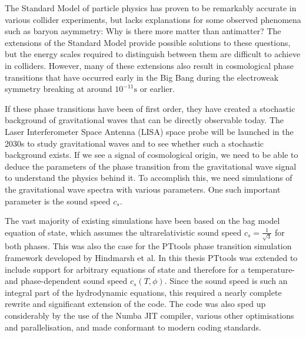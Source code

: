\iffalse
Motivation
\begin{itemize}
    \item Standard model: matches observations but lacks important explanations
    \item Baryon asymmetry
    \item GWs: a window to physics beyond the SM
    \item By phase transitions
    \item LISA project
\end{itemize}

The thesis
\begin{itemize}
    \item Highlights from the work, especially the title / thesis statement
    \item Findings
    \item Conclusion
\end{itemize}

This is among the last sections to be written.
\fi

The Standard Model of particle physics has proven to be remarkably accurate in various collider experiments,
but lacks explanations for some observed phenomena such as baryon asymmetry: Why is there more matter than antimatter?
The extensions of the Standard Model provide possible solutions to these questions,
but the energy scales required to distinguish between them are difficult to achieve in colliders.
However, many of these extensions also result in cosmological phase transitions that have occurred early in the Big Bang during the electroweak symmetry breaking at around $10^{-11} \text{s}$ or earlier.

If these phase transitions have been of first order,
they have created a stochastic background of gravitational waves that can be directly observable today.
The Laser Interferometer Space Antenna (LISA) space probe will be launched in the 2030s to study gravitational waves and
to see whether such a stochastic background exists.
If we see a signal of cosmological origin,
we need to be able to deduce the parameters of the phase transition from the gravitational wave signal to understand the physics behind it.
To accomplish this, we need simulations of the gravitational wave spectra with various parameters.
One such important parameter is the sound speed $c_s$.

The vast majority of existing simulations have been based on the bag model equation of state,
which assumes the ultrarelativistic sound speed $c_s =\frac{1}{\sqrt{3}}$ for both phases.
This was also the case for the PTtools phase transition simulation framework developed by Hindmarsh et al.
In this thesis PTtools was extended to include support for arbitrary equations of state and therefore for a temperature- and phase-dependent sound speed $c_s(T,\phi)$.
Since the sound speed is such an integral part of the hydrodynamic equations,
this required a nearly complete rewrite and significant extension of the code.
The code was also sped up considerably by the use of the Numba JIT compiler, various other optimisations and parallelisation,
and made conformant to modern coding standards.

